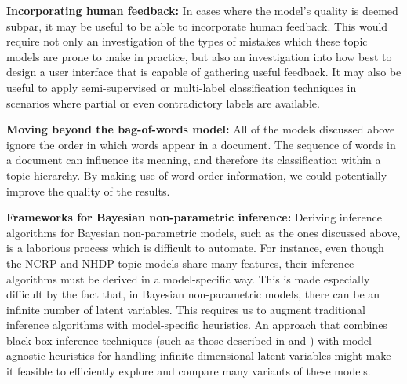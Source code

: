 \documentclass{article}
\begin{document}
\textbf{Incorporating human feedback:}
In cases where the model's quality is deemed subpar, it may be useful to be able to incorporate human feedback.
This would require not only an investigation of the types of mistakes which these topic models are prone to make in practice, but also an investigation into how best to design a user interface that is capable of gathering useful feedback.
It may also be useful to apply semi-supervised or multi-label classification techniques in scenarios where partial or even contradictory labels are available.

\textbf{Moving beyond the bag-of-words model:}
All of the models discussed above ignore the order in which words appear in a document.
The sequence of words in a document can influence its meaning, and therefore its classification within a topic hierarchy.
By making use of word-order information, we could potentially improve the quality of the results.

\textbf{Frameworks for Bayesian non-parametric inference:}
Deriving inference algorithms for Bayesian non-parametric models, such as the ones discussed above, is a laborious process which is difficult to automate.
For instance, even though the NCRP and NHDP topic models share many features, their inference algorithms must be derived in a model-specific way.
This is made especially difficult by the fact that, in Bayesian non-parametric models, there can be an infinite number of latent variables.
This requires us to augment traditional inference algorithms with model-specific heuristics.
An approach that combines black-box inference techniques (such as those described in \cite{ranganath2014blackbox} and \cite{ranganath2016operator}) with model-agnostic heuristics for handling infinite-dimensional latent variables might make it feasible to efficiently explore and compare many variants of these models.

\clearpage
\nocite{*}
%


\end{document}
